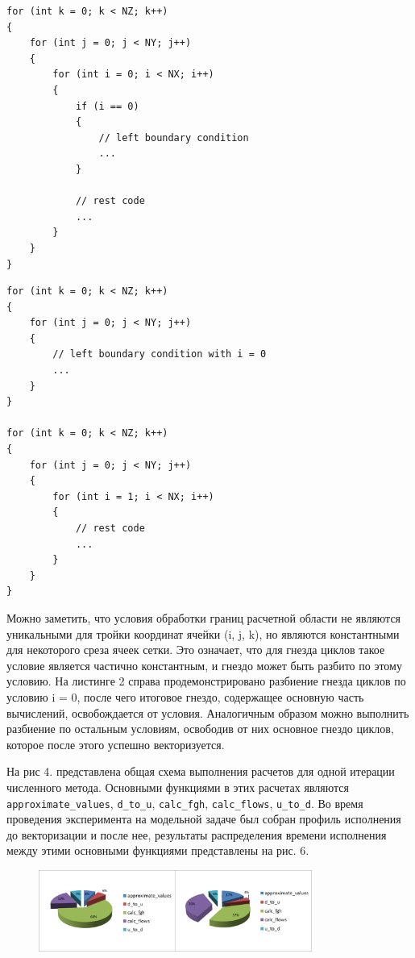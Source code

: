 \begin{lstlisting}[caption={caption},label={label}]
for (int k = 0; k < NZ; k++)
{
    for (int j = 0; j < NY; j++)
    {
        for (int i = 0; i < NX; i++)
        {
            if (i == 0)
            {
                // left boundary condition
                ...
            }

            // rest code
            ...
        }
    }
}
\end{lstlisting}

\begin{lstlisting}[caption={caption},label={label}]
for (int k = 0; k < NZ; k++)
{
    for (int j = 0; j < NY; j++)
    {
        // left boundary condition with i = 0
        ...
    }
}

for (int k = 0; k < NZ; k++)
{
    for (int j = 0; j < NY; j++)
    {
        for (int i = 1; i < NX; i++)
        {
            // rest code
            ...
        }
    }
}
\end{lstlisting}

Можно заметить, что условия обработки границ расчетной области не являются уникальными для тройки координат ячейки (i, j, k), но являются константными для некоторого среза ячеек сетки.
Это означает, что для гнезда циклов такое условие является частично константным, и гнездо может быть разбито по этому условию.
На листинге 2 справа продемонстрировано разбиение гнезда циклов по условию i = 0, после чего итоговое гнездо, содержащее основную часть вычислений, освобождается от условия.
Аналогичным образом можно выполнить разбиение по остальным условиям, освободив от них основное гнездо циклов, которое после этого успешно векторизуется.

На рис 4. представлена общая схема выполнения расчетов для одной итерации численного метода.
Основными функциями в этих расчетах являются \texttt{approximate\_values}, \texttt{d\_to\_u}, \texttt{calc\_fgh}, \texttt{calc\_flows}, \texttt{u\_to\_d}.
Во время проведения эксперимента на модельной задаче был собран профиль исполнения до векторизации и после нее, результаты распределения времени исполнения между этими основными функциями представлены на рис. 6.

\begin{figure}[ht]
	\centering
	\includegraphics[width=0.8\textwidth]{./pics/text_4_ibm/diagr.png}
	\caption{}
	\label{fig:text_4_ibm_diagr}
\end{figure}

